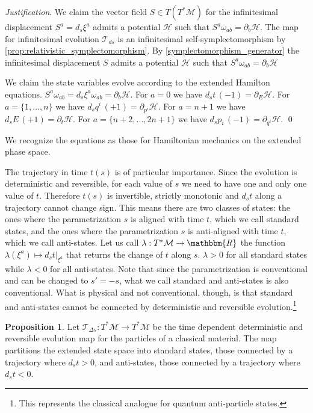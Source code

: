 \documentclass[aps,pra,10pt,twocolumn,floatfix,nofootinbib]{revtex4-1}
\numberwithin{equation}{section}
\theoremstyle{definition}
\newtheorem{prop}[equation]{Proposition}
\newenvironment{justification}{\emph{Justification}.}{\qed}
\begin{document}
\begin{justification}
We claim the vector field $S \in T(T^*\mathcal{M})$ for the infinitesimal displacement $S^a = d_s\xi^a$ admits a potential $\mathcal{H}$ such that $S^{a} \omega_{ab} = \partial_{b}\mathcal{H}$. The map for infinitesimal evolution $\mathcal{T}_{ds}$ is an infinitesimal self-symplectomorphism by \ref{prop:relativistic_symplectomorphism}. By \ref{symplectomorphism_generator} the infinitesimal displacement $S$ admits a potential $\mathcal{H}$ such that $S^{a} \omega_{ab} = \partial_{b}\mathcal{H}$

We claim the state variables evolve according to the extended Hamilton equations. $S^{a} \omega_{ab} = d_s\xi^a \omega_{ab} = \partial_{b}\mathcal{H}$. For $a = 0$ we have $d_s t \, (-1) = \partial_{E} \mathcal{H}$. For  $a=\{1,...,n\}$ we have $d_s q^i \, (+1) = \partial_{p^i} \mathcal{H}$. For $a=n+1$ we have $d_s E \, (+1) = \partial_{t} \mathcal{H}$. For $a=\{n+2,...,2n + 1\}$ we have $d_s p_i \, (-1) = \partial_{q^i} \mathcal{H}$.
\end{justification}

We recognize the equations as those for Hamiltonian mechanics on the extended phase space.\cite{Synge, Struckmeier}

The trajectory in time $t(s)$ is of particular importance. Since the evolution is deterministic and reversible, for each value of $s$ we need to have one and only one value of $t$. Therefore $t(s)$ is invertible, strictly monotonic and $d_{s}t$ along a trajectory cannot change sign. This means there are two classes of states: the ones where the parametrization $s$ is aligned with time $t$, which we call standard states, and the ones where the parametrization $s$ is anti-aligned with time $t$, which we call anti-states. Let us call $\lambda : T^*\mathcal{M} \rightarrow \mathbbm{R}$ the function $\lambda (\xi^a) \mapsto d_s t |_{\xi^a}$ that returns the change of $t$ along $s$. $\lambda > 0$ for all standard states while $\lambda < 0$ for all anti-states.  Note that since the parametrization is conventional and can be changed to $s'=-s$, what we call standard and anti-states is also conventional. What is physical and not conventional, though, is that standard and anti-states cannot be connected by deterministic and reversible evolution.\footnote{This represents the classical analogue for quantum anti-particle states.}

\begin{prop}\label{prop:antistates}
	Let $\mathcal{T}_{\Delta s}: T^*\mathcal{M} \rightarrow T^*\mathcal{M}$ be the time dependent deterministic and reversible evolution map for the particles of a classical material. The map partitions the extended state space into standard states, those connected by a trajectory where $d_{s}t>0$, and anti-states, those connected by a trajectory where $d_{s}t<0$.
\end{prop}
\end{document}
